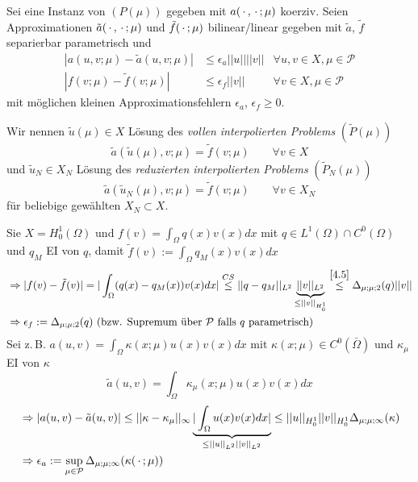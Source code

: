 \begin{defn} \label{4.8}
Sei eine Instanz von $(P(\mu))$ gegeben mit $a(\,\cdot\,,\,\cdot\,;\mu)$ koerziv. Seien Approximationen $\tilde{a}(\,\cdot\,,\,\cdot\,;\mu)$ und $\tilde{f}(\,\cdot\,;\mu)$ bilinear/linear gegeben mit $\tilde{a}$, $\tilde{f}$ separierbar parametrisch und
\begin{align*}
	| a(u,v;\mu) - \tilde{a}(u,v;\mu) | &\leq \epsilon_a ||u|| ||v|| &\forall u,v \in X, \mu \in \mathcal{P} \\
	|f(v;\mu) - \tilde{f}(v;\mu) | &\leq \epsilon_f ||v|| &\forall v \in X, \mu \in \mathcal{P}
\end{align*} 
mit möglichen kleinen Approximationsfehlern $\epsilon_a$, $\epsilon_f \geq 0$.

Wir nennen $\tilde{u}(\mu) \in X$ Lösung des \emph{vollen interpolierten Problems} $(\tilde{P}(\mu))$
\[
	\tilde{a}(\tilde{u}(\mu),v;\mu) = \tilde{f}(v;\mu)	\qquad \forall v \in X
\]
und $\tilde{u}_N \in X_N$ Lösung des \emph{reduzierten interpolierten Problems} $(\tilde{P}_N(\mu))$
\[
	\tilde{a}(\tilde{u}_N(\mu),v;\mu) = \tilde{f}(v;\mu)	\qquad \forall v \in X_N
\]
für beliebige gewählten $X_N \subset X$.
\end{defn}

\begin{bem}
Sie $X=H_0^1(\Omega)$ und $f(v) = \int_{\Omega} q(x) v(x) dx$ mit $q \in L^1(\Omega) \cap C^0(\Omega)$ und $q_M$ EI von $q$, damit $\tilde{f}(v) := \int_{\Omega} q_M(x)v(x) dx$
\begin{align*}
& \Rightarrow |f(v) - \tilde{f}(v)| = | \int_{\Omega} (q(x) - q_M(x)) v(x) dx | \overset{CS}{\leq} || q - q_M||_{L^2} \underbrace{||v||_{L^2}}_{\leq ||v||_{H_0^1}} \overset{\ref{4.5}}{\leq} \Delta_{\mu;\mu;2} (q) ||v|| \\
& \Rightarrow \epsilon_f := \Delta_{\mu;\mu;2} (q) \text{ (bzw. Supremum über } \mathcal{P} \text{ falls } q \text{ parametrisch)}
\end{align*}
Sei z.\,B. $a(u,v) = \int_{\Omega} \kappa(x;\mu) u(x) v(x) dx$ mit $\kappa(x;\mu) \in C^0(\bar{\Omega})$ und $\kappa_{\mu}$ EI von $\kappa$
\[
	\tilde{a}(u,v) = \int_{\Omega} \kappa_{\mu} (x;\mu) u(x) v(x) dx
\]
\begin{align*}
	& \Rightarrow |a(u,v) - \tilde{a}(u,v) | \leq || \kappa - \kappa_{\mu}||_{\infty} \underbrace{|\int_{\Omega} u(x) v(x) dx|}_{\leq ||u||_{L^2} ||v||_{L^2}} \leq || u||_{H_0^1} ||v||_{H_0^1} \Delta_{\mu;\mu;\infty} (\kappa) \\
	& \Rightarrow \epsilon_a := \sup\limits_{\mu \in \mathcal{P}} \Delta_{\mu;\mu;\infty} (\kappa(\,\cdot\,;\mu))
\end{align*}
\end{bem}

